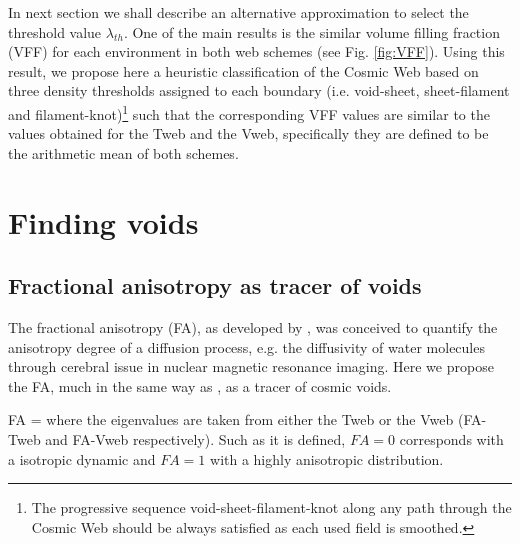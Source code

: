 \documentclass[a4,useAMS,usenatbib,usegraphicx]{latex/mn2e}
\begin{document}
In next section we shall describe an alternative approximation to select 
the threshold value $\lambda_{th}$. One of the main results is the similar 
volume filling fraction (VFF) for each environment in both web schemes 
(see Fig. \ref{fig:VFF}). Using this result, we propose here a heuristic 
classification of the Cosmic Web based on three density thresholds 
assigned to each boundary (i.e. void-sheet, sheet-filament and 
filament-knot)\footnote{The progressive sequence void-sheet-filament-knot 
along any path through the Cosmic Web should be always satisfied as each 
used field is smoothed.} such that the corresponding VFF values are 
similar to the values obtained for the Tweb and the Vweb, specifically 
they are defined to be the arithmetic mean of both schemes.


\section{Finding voids}
\label{sec:bulk_voids}


\subsection{Fractional anisotropy as tracer of voids}
\label{subsec:FA_voids}


The fractional anisotropy (FA), as developed by \citet{Basser95}, was 
conceived to quantify the anisotropy degree of a diffusion process, e.g. 
the diffusivity of water molecules through cerebral issue in nuclear
magnetic resonance imaging. Here we propose the FA, much in the same 
way as \citet{Libeskind13}, as a tracer of cosmic voids.


{ FA =  }
where the eigenvalues are taken from either the Tweb or the Vweb 
(FA-Tweb and FA-Vweb respectively). Such as it is defined, $FA=0$ 
corresponds with a isotropic dynamic and $FA=1$ with a highly anisotropic 
distribution.
\end{document}

